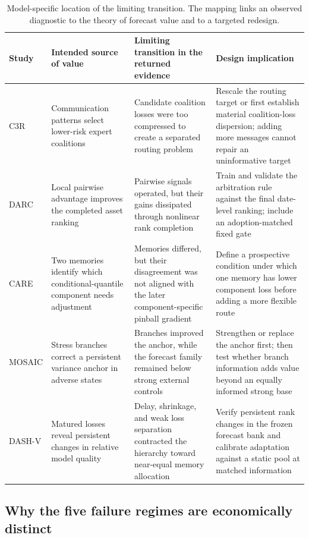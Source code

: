 \documentclass[10pt]{article}
\begin{document}
\begin{table}[H]
\centering
\small
\caption{Model-specific location of the limiting transition. The mapping links an observed diagnostic to the theory of forecast value and to a targeted redesign.}
\begin{tabular}{p{1.25cm}p{3.15cm}p{3.75cm}p{4.75cm}}
\toprule
Study & Intended source of value & Limiting transition in the returned evidence & Design implication \\
\midrule
C3R & Communication patterns select lower-risk expert coalitions & Candidate coalition losses were too compressed to create a separated routing problem & Rescale the routing target or first establish material coalition-loss dispersion; adding more messages cannot repair an uninformative target \\
DARC & Local pairwise advantage improves the completed asset ranking & Pairwise signals operated, but their gains dissipated through nonlinear rank completion & Train and validate the arbitration rule against the final date-level ranking; include an adoption-matched fixed gate \\
CARE & Two memories identify which conditional-quantile component needs adjustment & Memories differed, but their disagreement was not aligned with the later component-specific pinball gradient & Define a prospective condition under which one memory has lower component loss before adding a more flexible route \\
MOSAIC & Stress branches correct a persistent variance anchor in adverse states & Branches improved the anchor, while the forecast family remained below strong external controls & Strengthen or replace the anchor first; then test whether branch information adds value beyond an equally informed strong base \\
DASH-V & Matured losses reveal persistent changes in relative model quality & Delay, shrinkage, and weak loss separation contracted the hierarchy toward near-equal memory allocation & Verify persistent rank changes in the frozen forecast bank and calibrate adaptation against a static pool at matched information \\
\bottomrule
\end{tabular}
\end{table}

\subsection{Why the five failure regimes are economically distinct}
\end{document}
